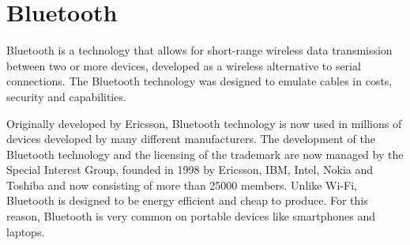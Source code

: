 \chapter{Bluetooth}
Bluetooth is a technology that allows for short-range wireless data transmission between two or more devices, developed as a wireless alternative to serial connections. The Bluetooth technology was designed to emulate cables in costs, security and capabilities.

Originally developed by Ericsson, Bluetooth technology is now used in millions of devices developed by many different manufacturers.
The development of the Bluetooth technology and the licensing of the trademark are now managed by the Special Interest Group, founded in 1998 by Ericsson, IBM, Intel, Nokia and Toshiba and now consisting of more than 25000 members.
Unlike Wi-Fi, Bluetooth is designed to be energy efficient and cheap to produce. For this reason, Bluetooth is very common on portable devices like smartphones and laptops.


